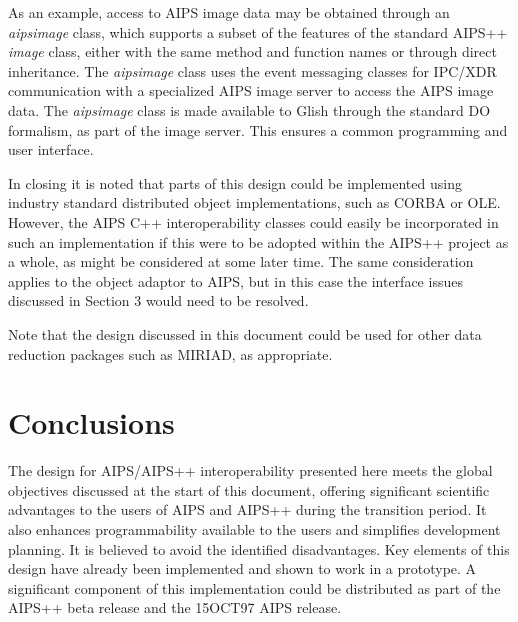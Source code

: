  As an example, access to AIPS image data may be obtained through an
{\it aipsimage} class, which supports a subset of the features of the
standard AIPS++ {\it image} class, either with the same method and
function names or through direct inheritance. The {\it aipsimage}
class uses the event messaging classes for IPC/XDR communication
with a specialized AIPS image server to access the AIPS image
data. The {\it aipsimage} class is made available to Glish through the
standard DO formalism, as part of the image server. This ensures a
common programming and user interface.

 In closing it is noted that parts of this design could be implemented
using industry standard distributed object implementations, such as
CORBA or OLE. However, the AIPS C++ interoperability classes could
easily be incorporated in such an implementation if this were to be
adopted within the AIPS++ project as a whole, as might be considered
at some later time. The same consideration applies to the object
adaptor to AIPS, but in this case the interface issues discussed in
Section 3 would need to be resolved.

 Note that the design discussed in this document could be used for
other data reduction packages such as MIRIAD, as appropriate.

\section{Conclusions}

 The design for AIPS/AIPS++ interoperability presented here meets the
global objectives discussed at the start of this document, offering
significant scientific advantages to the users of AIPS and AIPS++
during the transition period. It also enhances programmability
available to the users and simplifies development planning. It is
believed to avoid the identified disadvantages. Key elements of this
design have already been implemented and shown to work in a
prototype. A significant component of this implementation could be
distributed as part of the AIPS++ beta release and the 15OCT97 AIPS
release.





















